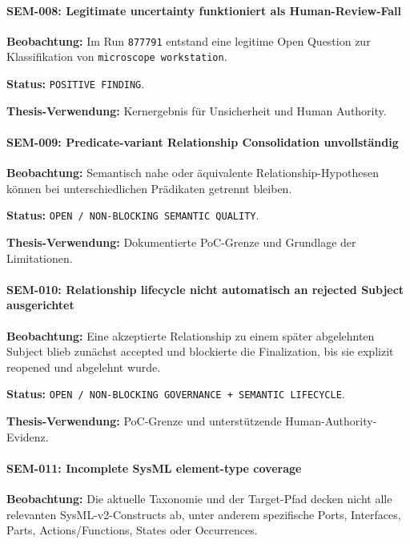 \paragraph{SEM-008: Legitimate uncertainty funktioniert als Human-Review-Fall}

\textbf{Beobachtung:}
Im Run \texttt{877791} entstand eine legitime Open Question zur Klassifikation
von \texttt{microscope workstation}.

\textbf{Status:}
\texttt{POSITIVE FINDING}.

\textbf{Thesis-Verwendung:}
Kernergebnis für Unsicherheit und Human Authority.


\paragraph{SEM-009: Predicate-variant Relationship Consolidation unvollständig}

\textbf{Beobachtung:}
Semantisch nahe oder äquivalente Relationship-Hypothesen können bei
unterschiedlichen Prädikaten getrennt bleiben.

\textbf{Status:}
\texttt{OPEN / NON-BLOCKING SEMANTIC QUALITY}.

\textbf{Thesis-Verwendung:}
Dokumentierte PoC-Grenze und Grundlage der Limitationen.


\paragraph{SEM-010: Relationship lifecycle nicht automatisch an rejected Subject ausgerichtet}

\textbf{Beobachtung:}
Eine akzeptierte Relationship zu einem später abgelehnten Subject blieb zunächst
accepted und blockierte die Finalization, bis sie explizit reopened und abgelehnt
wurde.

\textbf{Status:}
\texttt{OPEN / NON-BLOCKING GOVERNANCE + SEMANTIC LIFECYCLE}.

\textbf{Thesis-Verwendung:}
PoC-Grenze und unterstützende Human-Authority-Evidenz.


\paragraph{SEM-011: Incomplete SysML element-type coverage}

\textbf{Beobachtung:}
Die aktuelle Taxonomie und der Target-Pfad decken nicht alle relevanten
SysML-v2-Constructs ab, unter anderem spezifische Ports, Interfaces, Parts,
Actions/Functions, States oder Occurrences.

